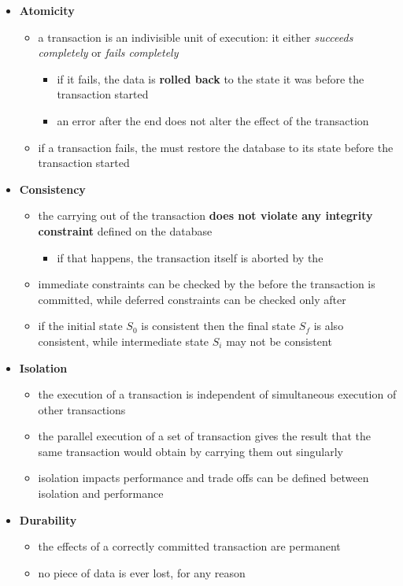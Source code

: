 \documentclass[english]{article}
\begin{document}
\begin{itemize}
  \item \textbf{Atomicity}
        \begin{itemize}
          \item a transaction is an indivisible unit of execution: it either \textit{succeeds completely} or \textit{fails completely}
                \begin{itemize}
                  \item if it fails, the data is \textbf{rolled back} to the state it was before the transaction started
                  \item an error after the end does not alter the effect of the transaction
                \end{itemize}
          \item if a transaction fails, the \DBMS must restore the database to its state before the transaction started
        \end{itemize}
  \item \textbf{Consistency}
        \begin{itemize}
          \item the carrying out of the transaction \textbf{does not violate any integrity constraint} defined on the database
                \begin{itemize}
                  \item if that happens, the transaction itself is aborted by the \DBMS
                \end{itemize}
          \item immediate constraints can be checked by the \DBMS before the transaction is committed, while deferred constraints can be checked only after
          \item if the initial state \(S_0\) is consistent then the final state \(S_f\) is also consistent, while intermediate state \(S_i\) may not be consistent
        \end{itemize}
  \item \textbf{Isolation}
        \begin{itemize}
          \item the execution of a transaction is independent of simultaneous execution of other transactions
          \item the parallel execution of a set of transaction gives the result that the same transaction would obtain by carrying them out singularly
          \item isolation impacts performance and trade offs can be defined between isolation and performance
        \end{itemize}
  \item \textbf{Durability}
        \begin{itemize}
          \item the effects of a correctly committed transaction are permanent
          \item no piece of data is ever lost, for any reason
        \end{itemize}
\end{itemize}
\end{document}
